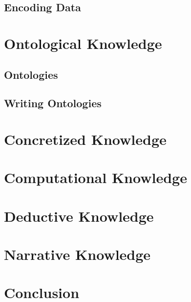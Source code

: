 \documentclass{book}
\begin{document}
\chapter{Encoding Data}\label{sec:wuv:codecs}
  

\part{Ontological Knowledge}\label{sec:wuv:ont}

\chapter{Ontologies}
 

\chapter{Writing Ontologies}
 

\part{Concretized Knowledge}\label{sec:wuv:concr}

\part{Computational Knowledge}\label{sec:wuv:comp}

\part{Deductive Knowledge}\label{sec:wuv:ded}



\part{Narrative Knowledge}\label{sec:wuv:narr}

\part{Conclusion}\label{sec:wuv:conc}

%
%
%
%
%
%


\end{document}
